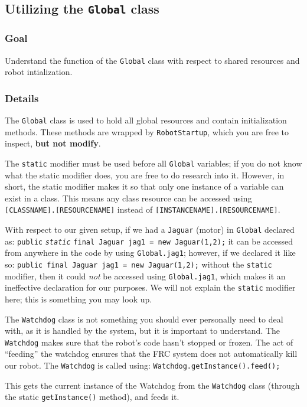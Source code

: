 \documentclass[a4paper]{article}
\begin{document}
\pagebreak\subsection{Utilizing the \lstinline{Global} class}
\subsubsection{Goal} Understand the function of the \lstinline{Global} class with respect to shared resources and robot intialization.
\subsubsection{Details} The \lstinline{Global} class is used to hold all global resources and contain initialization methods. These methods are wrapped by \lstinline{RobotStartup}, which you are free to inspect, \textbf{but not modify}.

The \lstinline{static} modifier must be used before all \lstinline{Global} variables; if you do not know what the static modifier does, you are free to do research into it. However, in short, the static modifier makes it so that only one instance of a variable can exist in a class. This means any class resource can be accessed using \lstinline{[CLASSNAME].[RESOURCENAME]} instead of \lstinline{[INSTANCENAME].[RESOURCENAME]}.

With respect to our given setup, if we had a \lstinline{Jaguar} (motor) in \lstinline{Global} declared as: \lstinline{public} \textit{\lstinline{static}} \lstinline{final Jaguar jag1 = new Jaguar(1,2);} it can be accessed from anywhere in the code by using \lstinline{Global.jag1}; however, if we declared it like so: \lstinline{public final Jaguar jag1 = new Jaguar(1,2);} without the \lstinline{static} modifier, then it could \textit{not} be accessed using \lstinline{Global.jag1}, which makes it an ineffective declaration for our purposes. We will not explain the \lstinline{static} modifier here; this is something you may look up.

The \lstinline{Watchdog} class is not something you should ever personally need to deal with, as it is handled by the system, but it is important to understand. The \lstinline{Watchdog} makes sure that the robot's code hasn't stopped or frozen. The act of ``feeding'' the watchdog ensures that the FRC system does not automatically kill our robot. The \lstinline{Watchdog} is called using: \lstinline{Watchdog.getInstance().feed();}

This gets the current instance of the Watchdog from the \lstinline{Watchdog} class (through the static \lstinline{getInstance()} method), and feeds it.
\end{document}
